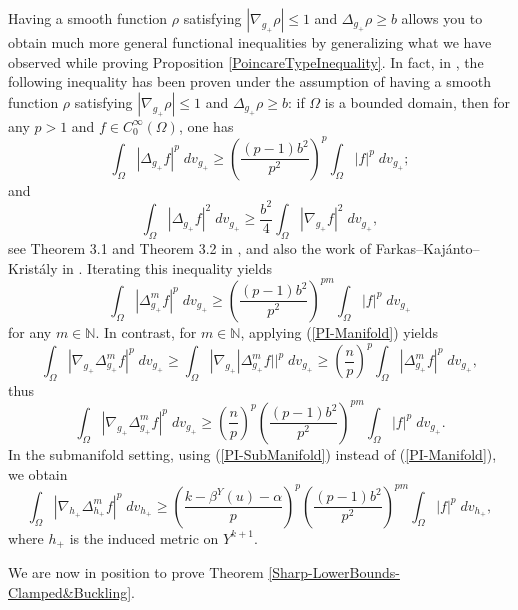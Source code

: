 \documentclass{amsart}
\begin{document}
Having a smooth function $\rho$ satisfying $|\nabla_{g_+}\rho|\le 1$ and $\Delta_{g_+}\rho\ge b$ allows you to obtain much more general functional inequalities by generalizing what we have observed while proving Proposition \ref{PoincareTypeInequality}. 
In fact, in \cite{LinHezi2025Sgef}, the following inequality has been proven under the assumption of having a smooth function $\rho$ satisfying $|\nabla_{g_+}\rho|\le 1$ and $\Delta_{g_+}\rho\ge b$: if $\Omega$ is a bounded domain, then for any $p>1$ and $f\in C^\infty_0(\Omega)$, one has 
    \[
        \int_{\Omega}|\Delta_{g_+}f|^p\;dv_{g_+} \ge \left(\frac{(p-1)b^2}{p^2}\right)^p\int_\Omega|f|^p\;dv_{g_+};
    \]
and
\[
\int_\Omega |\Delta_{g_+}f|^2\;dv_{g_+}\ge \frac{b^2}{4} \int_\Omega |\nabla_{g_+}f|^2\;dv_{g_+},
\]
see Theorem 3.1 and Theorem 3.2 in \cite{LinHezi2025Sgef}, and also the work of Farkas--Kaj\'anto--Krist\'aly in \cite{FarkasKajantoKristaly2025}. Iterating this inequality yields
\begin{equation}\label{Lin1}
    \int_{\Omega}|\Delta_{g_+}^mf|^p\;dv_{g_+}\ge \left(\frac{(p-1)b^2}{p^2}\right)^{pm}\int_{\Omega}|f|^p\;dv_{g_+}
\end{equation}
for any $m\in \mathbb{N}$. In contrast, for $m\in \mathbb{N}$, applying (\ref{PI-Manifold}) yields
\[
\int_\Omega |\nabla_{g_+}\Delta_{g_+}^mf|^p\;dv_{g_+}\ge \int_\Omega |\nabla_{g_+}|\Delta^m_{g_+}f||^p\;dv_{g_+}\ge \left(\frac{n}{p}\right)^p\int_\Omega |\Delta_{g_+}^mf|^p\;dv_{g_+},
\]
thus
\begin{equation}\label{Lin2}
    \int_\Omega |\nabla_{g_+}\Delta^m_{g_+}f|^p\;dv_{g_+}\ge\left(\frac{n}{p}\right)^p\left(\frac{(p-1)b^2}{p^2}\right)^{pm}\int_\Omega |f|^p\;dv_{g_+}.
\end{equation}
In the submanifold setting, using (\ref{PI-SubManifold}) instead of (\ref{PI-Manifold}), we obtain
\begin{equation}\label{Lin3}
    \int_\Omega |\nabla_{h_+}\Delta^m_{h_+}f|^p\;dv_{h_+}\ge\left(\frac{k - \beta^Y(u) - \alpha}{p}\right)^p\left(\frac{(p-1)b^2}{p^2}\right)^{pm}\int_\Omega |f|^p\;dv_{h_+},
\end{equation}
where $h_+$ is the induced metric on $Y^{k+1}$. 

We are now in position to prove Theorem \ref{Sharp-LowerBounds-Clamped&Buckling}.
\end{document}
